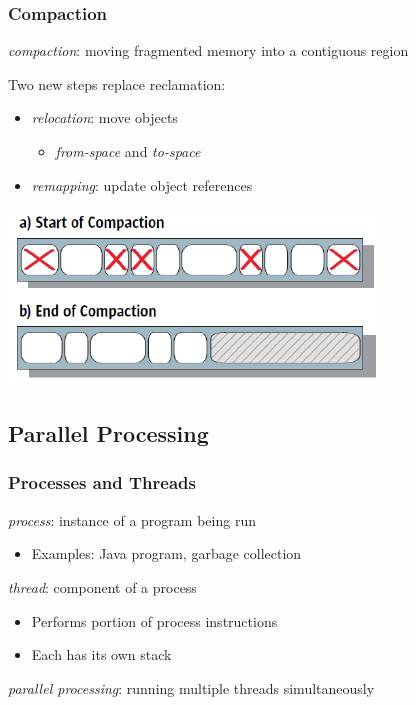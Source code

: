 \documentclass{beamer}
\newcommand{\linespace}{\vskip 0.25cm}
\begin{document}
\begin{frame}

\frametitle{Compaction}

\emph{compaction}: moving fragmented memory into a contiguous region

\linespace

Two new steps replace reclamation:
\begin{itemize}
\item \emph{relocation}: move objects 
\begin{itemize}
\item \emph{from-space} and \emph{to-space}
\end{itemize}
\item \emph{remapping}: update object references
\end{itemize}

\linespace

\begin{center}
\includegraphics[width=.70\textwidth]{Illustrations/bg_compaction.pdf}
\end{center}

\end{frame}



\subsection[PP Basics]{Parallel Processing}

\begin{frame}

\frametitle{Processes and Threads}

\emph{process}: instance of a program being run
\begin{itemize}
\item Examples: Java program, garbage collection
\end{itemize}

\linespace
\linespace

\emph{thread}: component of a process
\begin{itemize}
\item Performs portion of process instructions %
\item Each has its own stack
\end{itemize}

\linespace
\linespace

\emph{parallel processing}: running multiple threads simultaneously

\end{frame}
\end{document}
